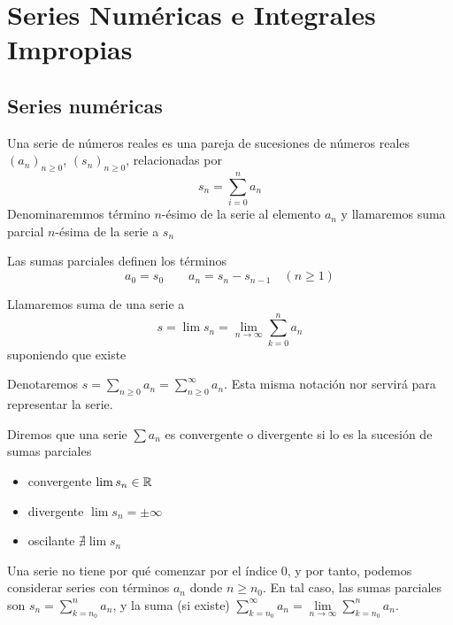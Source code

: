 \section{Series Numéricas e Integrales Impropias}

\subsection{Series numéricas}

\begin{defi}
	Una serie de números reales es una pareja de sucesiones de números reales
	$(a_n)_{n \geq 0}$, $(s_n)_{n \geq 0}$, relacionadas por
	\[
		s_n = \sum_{i=0}^{n} a_n
	\]
	Denominaremmos término $n$-ésimo de la serie al elemento $a_n$ y llamaremos
	suma parcial $n$-ésima de la serie a $s_n$
\end{defi}
\begin{obs*}
	Las sumas parciales definen los términos
	\[
		a_0 = s_0 \qquad a_n = s_n - s_{n-1} \quad (n \geq 1)
	\]
\end{obs*}

\begin{defi}
	Llamaremos suma de una serie a
	\[
		s = \lim s_n = \lim\limits_{n \to \infty} \sum_{k=0}^{n} a_n
	\]
	suponiendo que existe
\end{defi}
\begin{obs*}
	Denotaremos $s = \sum\limits_{n \geq 0} a_n = \sum\limits_{n \geq 0}^{\infty} a_n$.
	Esta misma notación nor servirá para representar la serie.
\end{obs*}

\begin{defi}
	Diremos que una serie $\sum a_n$ es convergente o divergente si lo es la
	sucesión de sumas parciales
	\begin{itemize}
		\item convergente \qquad $\lim s_n \in \mathbb{R}$
		\item divergente  \qquad $\lim s_n = \pm \infty$
		\item oscilante \qquad $\nexists \lim s_n$
	\end{itemize}
\end{defi}

\begin{obs}
	Una serie no tiene por qué comenzar por el índice 0, y por tanto, podemos considerar
	series con términos $a_n$ donde $n \geq n_0$. En tal caso, las sumas parciales son
	$s_n = \sum\limits_{k=n_0}^n a_n$, y la suma (si existe) $\sum\limits_{k=n_0}^{\infty}
	a_n = \lim\limits_{n \to \infty} \sum\limits_{k=n_0}^n a_n$.
\end{obs}


